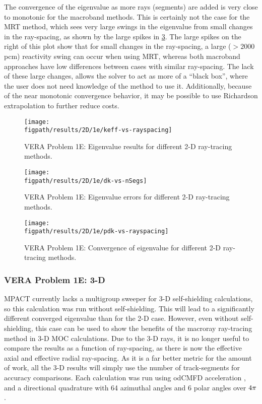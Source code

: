 {{{{        The convergence of the eigenvalue as more rays (segments) are added is very close to monotonic for the macroband methods.
        This is certainly not the case for the \ac{MRT} method, which sees very large swings in the eigenvalue from small changes in the ray-spacing, as shown by the large spikes in \cref{fig:MB:1e:pdk-vs-rayspacing}.
        The large spikes on the right of this plot show that for small changes in the ray-spacing, a large ($>2000$ pcm) reactivity swing can occur when using \ac{MRT}, whereas both macroband approaches have low differences between cases with similar ray-spacing.
        The lack of these large changes, allows the solver to act as more of a ``black box'', where the user does not need knowledge of the method to use it.
        Additionally, because of the near monotonic convergence behavior, it may be possible to use Richardson extrapolation to further reduce costs.

        \begin{figure}[hp]
          \centering
          \texttt{[image: \\figpath/results/2D/1e/keff-vs-rayspacing]}
          \caption{VERA Problem 1E: Eigenvalue results for different 2-D ray-tracing methods. \label{fig:MB:1e:keff-vs-rayspacing}}
        \end{figure}
        \begin{figure}[hp]
          \centering
          \texttt{[image: \\figpath/results/2D/1e/dk-vs-nSegs]}
          \caption{VERA Problem 1E: Eigenvalue errors for different 2-D ray-tracing methods. \label{fig:MB:1e:dk-vs-nSegs}}
        \end{figure}
        \begin{figure}[hp]
          \centering
          \texttt{[image: \\figpath/results/2D/1e/pdk-vs-rayspacing]}
          \caption{VERA Problem 1E: Convergence of eigenvalue for different 2-D ray-tracing methods. \label{fig:MB:1e:pdk-vs-rayspacing}}
        \end{figure}
      }

      \subsubsection{VERA Problem 1E: 3-D}{\label{sssec:MR:1E:3-D}
        MPACT currently lacks a multigroup sweeper for 3-D self-shielding calculations, so this calculation was run without self-shielding.
        This will lead to a significantly different converged eigenvalue than for the 2-D case.
        However, even without self-shielding, this case can be used to show the benefits of the macroray ray-tracing method in 3-D \ac{MOC} calculations.
        Due to the 3-D rays, it is no longer useful to compare the results as a function of ray-spacing, as there is now the effective axial and effective radial ray-spacing.
        As it is a far better metric for the amount of work, all the 3-D results will simply use the number of track-segments for accuracy comparisons.
        Each calculation was run using od\ac{CMFD} acceleration \cite{Zhu2016}, and a directional quadrature with 64 azimuthal angles and 6 polar angles over $4\pi$.

}}}}
